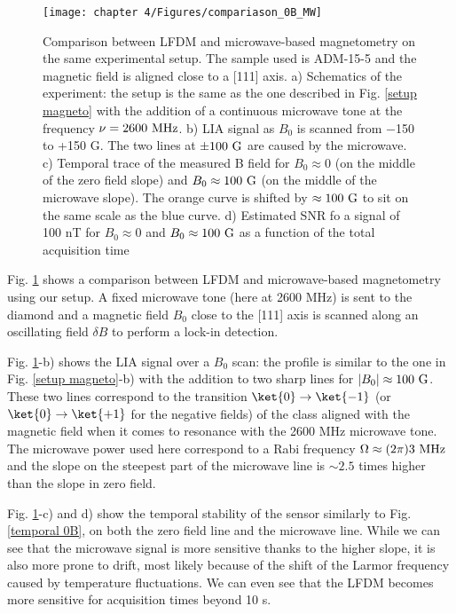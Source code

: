 \documentclass[a4paper, 11pt]{book}
\begin{document}
\begin{figure}[h!]
\centering
\texttt{[image: chapter 4/Figures/compariason\_0B\_MW]}
\caption{Comparison between LFDM and microwave-based magnetometry on the same experimental setup. The sample used is ADM-15-5 and the magnetic field is aligned close to a [111] axis. a) Schematics of the experiment: the setup is the same as the one described in Fig. \ref{setup magneto} with the addition of a continuous microwave tone at the frequency $\nu=2600\ \rm MHz$. b) LIA signal as $B_0$ is scanned from $-$150 to +150 G. The two lines at $\pm 100\ \rm G$ are caused by the microwave. c) Temporal trace of the measured B field for $B_0 \approx 0$ (on the middle of the zero field slope) and $B_0 \approx 100\ \rm G$ (on the middle of the microwave slope). The orange curve is shifted by $\approx 100\ \rm G$ to sit on the same scale as the blue curve. d) Estimated SNR fo a signal of 100 nT for $B_0 \approx 0$ and $B_0 \approx 100\ \rm G$ as a function of the total acquisition time}
\label{comparaison 0B MW}
\end{figure}

Fig. \ref{comparaison 0B MW} shows a comparison between LFDM and microwave-based magnetometry using our setup. A fixed microwave tone (here at 2600 MHz) is sent to the diamond and a magnetic field $B_0$ close to the [111] axis is scanned along an oscillating field $\delta B$ to perform a lock-in detection. 

Fig. \ref{comparaison 0B MW}-b) shows the LIA signal over a $B_0$ scan: the profile is similar to the one in Fig. \ref{setup magneto}-b) with the addition to two sharp lines for $|B_0| \approx 100\ \rm G$. These two lines correspond to the transition $\ket{0} \to \ket{-1}$ (or $\ket{0} \to \ket{+1}$ for the negative fields) of the class aligned with the magnetic field when it comes to resonance with the 2600 MHz microwave tone. The microwave power used here correspond to a Rabi frequency $\Omega \approx (2\pi) 3\ \rm MHz$ and the slope on the steepest part of the microwave line is $\sim 2.5$ times higher than the slope in zero field.

Fig. \ref{comparaison 0B MW}-c) and d) show the temporal stability of the sensor similarly to Fig. \ref{temporal 0B}, on both the zero field line and the microwave line. While we can see that the microwave signal is more sensitive thanks to the higher slope, it is also more prone to drift, most likely because of the shift of the Larmor frequency caused by temperature fluctuations. We can even see that the LFDM becomes more sensitive for acquisition times beyond 10 s.
\end{document}
